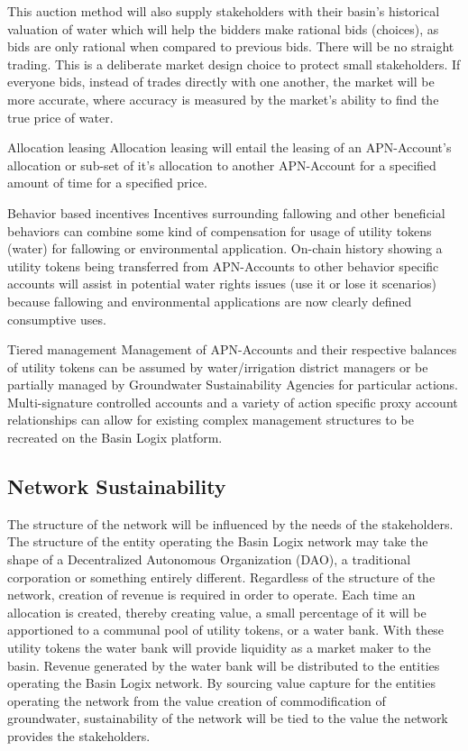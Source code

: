 \documentclass{tufte-handout}
\begin{document}
This auction method will also supply stakeholders with their basin's historical valuation of water which will help the bidders make rational bids (choices), as bids are only rational when compared to previous bids\cite{Allingham}. There will be no straight trading. This is a deliberate market design choice to protect small stakeholders\cite{Raffensperger}. If everyone bids, instead of trades directly with one another, the market will be more accurate, where accuracy is measured by the market's ability to find the true price of water.\break

Allocation leasing \break
Allocation leasing will entail the leasing of an APN-Account's allocation or sub-set of it's allocation to another APN-Account for a specified amount of time for a specified price.\break

Behavior based incentives \break
Incentives surrounding fallowing and other beneficial behaviors can combine some kind of compensation for usage of utility tokens (water) for fallowing or environmental application\cite{tule}. On-chain history showing a utility tokens being transferred from APN-Accounts to other behavior specific accounts will assist in potential water rights issues (use it or lose it scenarios) because fallowing and environmental applications are now clearly defined consumptive uses.\break

Tiered management \break
Management of APN-Accounts and their respective balances of utility tokens can be assumed by water/irrigation district managers or be partially managed by Groundwater Sustainability Agencies for particular actions. Multi-signature controlled accounts and a variety of action specific proxy account relationships\cite{proxy} can allow for existing complex management structures to be recreated on the Basin Logix platform.\break 

\subsection{Network Sustainability}\label{sec:headings}

 The structure of the network will be influenced by the needs of the stakeholders. The structure of the entity operating the Basin Logix network may take the shape of a Decentralized Autonomous Organization (DAO), a traditional corporation or something entirely different. Regardless of the structure of the network, creation of revenue is required in order to operate. Each time an allocation is created, thereby creating value, a small percentage of it will be apportioned to a communal pool of utility tokens, or a water bank. With these utility tokens the water bank will provide liquidity as a market maker to the basin. Revenue generated by the water bank will be distributed to the entities operating the Basin Logix network. By sourcing value capture for the entities operating the network from the value creation of commodification of groundwater, sustainability of the network will be tied to the value the network provides the stakeholders. 
\end{document}
